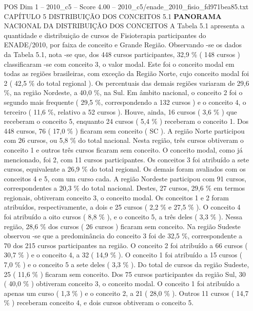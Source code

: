 \begin{textsample}{POS Dim 1 – 2010\_c5 – Score 4.00 – 2010\_c5/enade\_2010\_fisio\_fd971bea85.txt}  \label{ex:f1_pos_133}
CAPÍTULO 5 DISTRIBUIÇÃO DOS CONCEITOS 5.1 \textbf{PANORAMA} NACIONAL DA DISTRIBUIÇÃO DOS CONCEITOS A Tabela 5.1 apresenta a quantidade e distribuição de cursos de Fisioterapia participantes do ENADE/2010, por faixa de conceito e Grande Região.
Observando -se os dados da Tabela 5.1, nota -se que, dos 448 cursos participantes, 32,9 \% ( 148 cursos ) classificaram -se com conceito 3, o valor modal.
Este foi o conceito modal em todas as regiões brasileiras, com exceção da Região Norte, cujo conceito modal foi 2 ( 42,5 \% do total regional ).
Os percentuais das demais regiões variaram de 29,6 \%, na região Nordeste, a 40,0 \%, na Sul.
Em âmbito nacional, o conceito 2 foi o segundo mais frequente ( 29,5 \%, correspondendo a 132 cursos ) e o conceito 4, o terceiro ( 11,6 \%, relativo a 52 cursos ).
Houve, ainda, 16 cursos ( 3,6 \% ) que receberam o conceito 5, enquanto 24 cursos ( 5,4 \% ) receberam o conceito 1.
Dos 448 cursos, 76 ( 17,0 \% ) ficaram sem conceito ( SC ).
A região Norte participou com 26 cursos, ou 5,8 \% do total nacional.
Nesta região, três cursos obtiveram o conceito 1 e outros três cursos ficaram sem conceito.
O conceito modal, como já mencionado, foi 2, com 11 cursos participantes.
Os conceitos 3 foi atribuído a sete cursos, equivalente a 26,9 \% do total regional.
Os demais foram avaliados com os conceitos 4 e 5, com um curso cada.
A região Nordeste participou com 91 cursos, correspondentes a 20,3 \% do total nacional.
Destes, 27 cursos, 29,6 \% em termos regionais, obtiveram conceito 3, o conceito modal.
Os conceitos 1 e 2 foram atribuídos, respectivamente, a dois e 25 cursos ( 2,2 \% e 27,5 \% ).
O conceito 4 foi atribuído a oito cursos ( 8,8 \% ), e o conceito 5, a três deles ( 3,3 \% ).
Nessa região, 28,6 \% dos cursos ( 26 cursos ) ficaram sem conceito.
Na região Sudeste observou -se que a predominância do conceito 3 foi de 32,5 \%, correspondente a 70 dos 215 cursos participantes na região.
O conceito 2 foi atribuído a 66 cursos ( 30,7 \% ) e o conceito 4, a 32 ( 14,9 \% ).
O conceito 1 foi atribuído a 15 cursos ( 7,0 \% ) e o conceito 5 a sete deles ( 3,3 \% ).
Do total de cursos da região Sudeste, 25 ( 11,6 \% ) ficaram sem conceito.
Dos 75 cursos participantes da região Sul, 30 ( 40,0 \% ) obtiveram conceito 3, o conceito modal.
O conceito 1 foi atribuído a apenas um curso ( 1,3 \% ) e o conceito 2, a 21 ( 28,0 \% ).
Outros 11 cursos ( 14,7 \% ) receberam conceito 4, e dois cursos obtiveram o conceito 5.

\end{textsample}
